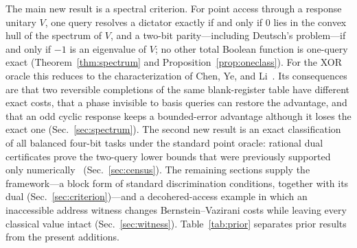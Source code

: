 \documentclass[
  aps,
  pra,
  reprint,
  nofootinbib
]{revtex4-2}
\begin{document}
The main new result is a spectral criterion. For point access through a
response unitary \(V\), one query resolves a dictator exactly if and only if
\(0\) lies in the convex hull of the spectrum of \(V\), and a two-bit
parity---including Deutsch's problem---if and only if \(-1\) is an eigenvalue
of \(V\); no other total Boolean function is one-query exact
(Theorem~\ref{thm:spectrum} and
Proposition~\ref{prop:oneclass}). For the XOR
oracle this reduces to the characterization of Chen, Ye, and
Li~\cite{ChenYeLi2020}. Its consequences are that two reversible completions of
the same blank-register table have different exact costs, that a phase
invisible to basis queries can restore the advantage, and that an odd cyclic
response keeps a bounded-error advantage although it loses the exact one
(Sec.~\ref{sec:spectrum}). The second new result is an exact classification of
all balanced four-bit tasks under the standard point oracle: rational dual
certificates prove the two-query lower bounds that were previously supported
only numerically~\cite{MontanaroJozsaMitchison2015} (Sec.~\ref{sec:census}).
The remaining sections supply the framework---a block form of standard
discrimination conditions, together with its dual (Sec.~\ref{sec:criterion})---and
a decohered-access example in which an inaccessible address witness changes
Bernstein--Vazirani costs while leaving every classical value intact
(Sec.~\ref{sec:witness}). Table~\ref{tab:prior} separates prior results from
the present additions.
\end{document}
